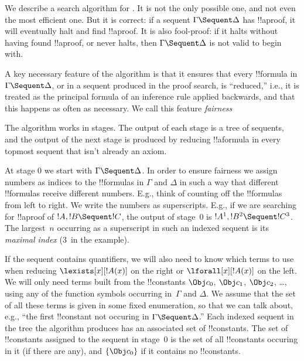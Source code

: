 \documentclass[../../../include/open-logic-section]{subfiles}
\begin{document}


We describe a search algorithm for . It is not the only
possible one, and not even the most efficient one. But it is correct:
if a sequent $\Gamma \Sequent \Delta$ has !!a{proof}, it will
eventually halt and find !!a{proof}. It is also fool-proof: if it
halts without having found !!a{proof}, or never halts, then $\Gamma
\Sequent \Delta$ is not valid to begin with.

A key necessary feature of the algorithm is that it ensures that every
!!{formula} in $\Gamma \Sequent \Delta$, or in a sequent produced in
the proof search, is ``reduced,'' i.e., it is treated as the principal
formula of an inference rule applied backwards, and that this happens
as often as necessary. We call this feature \emph{fairness}

The algorithm works in stages. The output of each stage is a tree of
sequents, and the output of the next stage is produced by reducing
!!a{formula} in every topmost sequent that isn't already an axiom.

At stage $0$ we start with $\Gamma \Sequent \Delta$. In order to
ensure fairness we assign numbers as indices to the !!{formula}s in
$\Gamma$ and $\Delta$ in such a way that different !!{formula}s
receive different numbers. E.g., think of counting off the
!!{formula}s from left to right. We write the numbers as superscripts.
E.g., if we are searching for !!a{proof} of $!A, !B \Sequent !C$, the
output of stage~$0$ is $!A^1, !B^2 \Sequent !C^3$. The largest~$n$
occurring as a superscript in such an indexed sequent is its
\emph{maximal index} ($3$~in the example).

If the sequent contains quantifiers, we will also need to know which
terms to use when reducing $\lexists[x][!A(x)]$ on the right or
$\lforall[x][!A(x)]$ on the left. We will only need terms built from
the !!{constant}s $\Obj c_0$, $\Obj c_1$, $\Obj c_2$, \dots, using any
of the function symbols occurring in~$\Gamma$ and $\Delta$. We assume
that the set of all these terms is given in some fixed enumeration, so
that we can talk about, e.g., ``the first !!{constant} not occuring in
$\Gamma \Sequent \Delta$.'' Each indexed sequent in the tree the
algorithm produces has an associated set of !!{constant}s. The set of
!!{constant}s assigned to the sequent in stage~$0$ is the set of all
!!{constant}s occuring in it (if there are any), and $\{\Obj c_0\}$ if
it contains no !!{constant}s.
\end{document}
